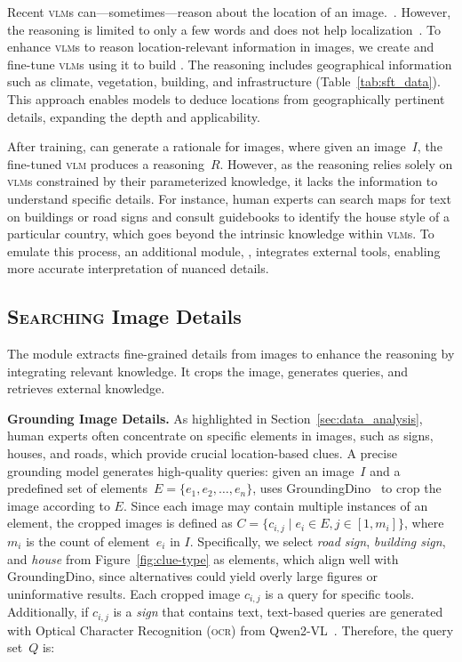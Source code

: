 Recent \textsc{vlm}s can---sometimes---reason about the location of an
image.~\cite{ligeoreasoner}. However, the reasoning is limited to only
a few words and does not help localization~\cite{zhang2024can}.
%
To enhance \textsc{vlm}s to reason location-relevant
information in images, we create \dataname and fine-tune \textsc{vlm}s using it to build \macname. The
reasoning includes geographical information such as
climate, vegetation, building, and infrastructure (Table~\ref{tab:sft_data}). This approach
enables models to deduce locations from geographically pertinent
details, expanding the depth and applicability. 

After training, \macname can generate a rationale for images, where given an image~\( I \), the fine-tuned \textsc{vlm} produces a reasoning~\( R \). However, as the reasoning relies solely on \textsc{vlm}s constrained by their parameterized knowledge, it lacks the information to understand specific details. For instance, human experts can search maps for text on buildings or road signs and consult guidebooks to identify the house style of a particular country, which goes beyond the intrinsic knowledge within \textsc{vlm}s. To emulate this process, an additional module, \micname, integrates external tools, enabling more accurate interpretation of nuanced details.


\subsection{\textsc{Searching} Image Details}
\label{sec:micro}

The \micname module extracts fine-grained details from images to enhance the reasoning by integrating relevant knowledge. It crops the image, generates queries, and retrieves external knowledge.

\textbf{Grounding Image Details.} As highlighted in Section~\ref{sec:data_analysis}, human experts often concentrate on specific elements in images, such as signs, houses, and roads, which provide crucial location-based clues. A precise grounding model generates high-quality queries: given an image~\( I \) and a predefined set of elements~\( E = \{e_1, e_2, \dots, e_n\} \), \micname uses GroundingDino~\cite{liu2023grounding} to crop the image according to \(E\). Since each image may contain multiple instances of an element, the cropped images is defined as \( C = \{ c_{i,j} \mid e_i \in E, j \in [1, m_i] \} \), where \( m_i \) is the count of element~\( e_i \) in \( I \). Specifically, we select \textit{road sign}, \textit{building sign}, and \textit{house} from Figure~\ref{fig:clue-type} as elements, which align well with GroundingDino, since alternatives could yield overly large figures or uninformative results. Each cropped image \( c_{i,j} \) is a query for specific tools. Additionally, if \( c_{i,j} \) is a \textit{sign} that contains text, text-based queries are generated with Optical Character Recognition (\textsc{ocr}) from Qwen2-VL~\cite{Qwen2VL}. Therefore, the query set~\( Q \) is:

